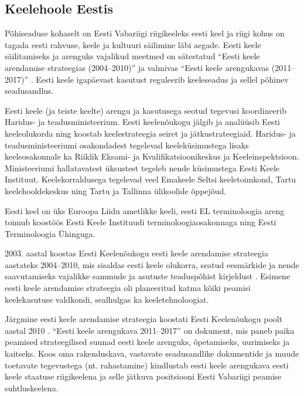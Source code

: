 \begin{multicols}{2}
\subsection{Keelehoole Eestis}

Põhiseaduse kohaselt on Eesti Vabariigi riigi\-keeleks eesti keel ja riigi kohus on tagada eesti rahvuse, keele ja kultuuri säili\-mine läbi aegade.  Eesti keele säilitamiseks ja arenguks vajalikud meetmed on sätestatud ``Eesti keele arendamise strateegias (2004--2010)'' \cite{KeeleStratEst} ja valmivas ``Eesti keele arengukavas (2011--2017)'' \cite{DevPlan}.  Eesti keele igapäevast kasutust reguleerib keeleseadus ja sellel põhinev seadusandlus.


Eesti keele (ja teiste keelte) arengu ja kasutusega seotud tegevusi koordineerib Haridus- ja teadusministeerium.  Eesti keelenõukogu jälgib ja analüüsib Eesti keeleolukorda ning koostab keelestrateegia seiret ja jätkustrateegiaid.  Haridus- ja teadusministeeriumi osakondadest tegelevad keeleküsimustega lisaks keeleosakonnale ka Riiklik Eksami- ja Kvalifikatsioonikeskus ja Keeleinspektsioon.  Ministeeriumi hallatavatest üksustest tegeleb nende küsimustega Eesti Keele Instituut. Keelekorraldusega tegelevad veel Emakeele Seltsi keeletoimkond, Tartu keelehooldekeskus ning Tartu ja Tallinna ülikoolide õppejõud.

Eesti keel on üks Euroopa Liidu ametlikke keeli, eesti EL terminoloogia areng toimub koostöös Eesti Keele Instituudi terminoloogiaosakonnaga ning Eesti Terminoloogia Ühinguga.

2003. aastal koostas Eesti Keelenõukogu eesti keele arendamise strateegia aastateks 2004--2010, mis sisaldas eesti keele olukorra, seatud eesmärkide ja nende saavutamiseks vajalikke sammude ja asutuste teaduspõhist kirjeldust \cite{KeeleStratEst}.  Esimene eesti keele arendamise strateegia oli planeeritud katma kõiki peamisi keelekasutuse valdkondi, sealhulgas ka keeletehnoloogiat.

Järgmine eesti keele arendamise strateegia koostati Eesti Keelenõukogu poolt aastal 2010 \cite{DevPlan}.  ``Eesti keele arengukava 2011--2017'' on dokument, mis paneb paika peamised strateegilised suunad eesti keele arenguks, õpetamiseks, uurimiseks ja kaitseks.  Koos oma rakenduskava, vastavate seadus\-andlike dokumentide ja muude toetavate tegevustega (nt. rahastamine) kindlustab eesti keele arengukava eesti keele staatuse riigikeelena ja selle jätkuva positsiooni Eesti Vabariigi peamise suhtluskeelena.


\end{multicols}

